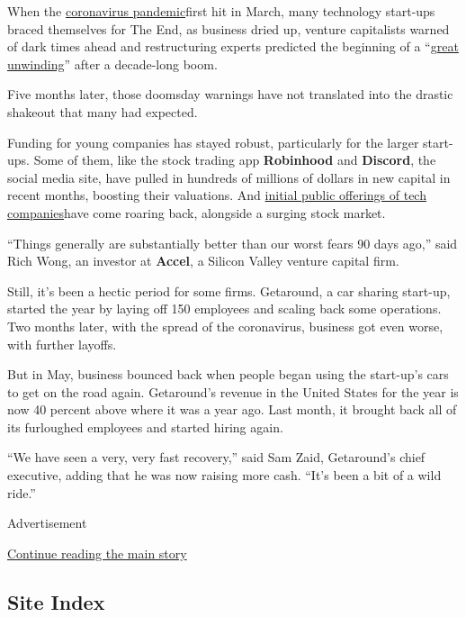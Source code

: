 When the
\href{https://www.nytimes3xbfgragh.onion/news-event/coronavirus?action=click\&pgtype=Article\&state=default\&module=styln-coronavirus\&region=TOP_BANNER\&context=storylines_menu}{coronavirus
pandemic}first hit in March, many technology start-ups braced themselves
for The End, as business dried up, venture capitalists warned of dark
times ahead and restructuring experts predicted the beginning of a
``\href{https://www.nytimes3xbfgragh.onion/2020/04/01/technology/virus-start-ups-pummeled-layoffs-unwinding.html}{great
unwinding}'' after a decade-long boom.

Five months later, those doomsday warnings have not translated into the
drastic shakeout that many had expected.

Funding for young companies has stayed robust, particularly for the
larger start-ups. Some of them, like the stock trading app
\textbf{Robinhood} and \textbf{Discord}, the social media site, have
pulled in hundreds of millions of dollars in new capital in recent
months, boosting their valuations. And
\href{https://www.nytimes3xbfgragh.onion/2020/06/17/technology/ipo-pandemic.html}{initial
public offerings of tech companies}have come roaring back, alongside a
surging stock market.

``Things generally are substantially better than our worst fears 90 days
ago,'' said Rich Wong, an investor at \textbf{Accel}, a Silicon Valley
venture capital firm.

Still, it's been a hectic period for some firms. Getaround, a car
sharing start-up, started the year by laying off 150 employees and
scaling back some operations. Two months later, with the spread of the
coronavirus, business got even worse, with further layoffs.

But in May, business bounced back when people began using the start-up's
cars to get on the road again. Getaround's revenue in the United States
for the year is now 40 percent above where it was a year ago. Last
month, it brought back all of its furloughed employees and started
hiring again.

``We have seen a very, very fast recovery,'' said Sam Zaid, Getaround's
chief executive, adding that he was now raising more cash. ``It's been a
bit of a wild ride.''

Advertisement

\protect\hyperlink{after-bottom}{Continue reading the main story}

\hypertarget{site-index}{%
\subsection{Site Index}\label{site-index}}


